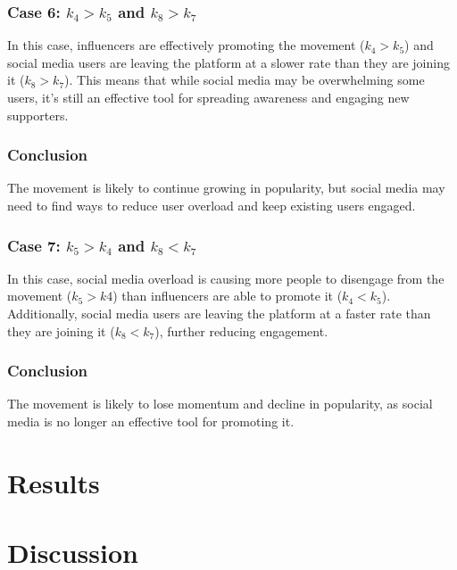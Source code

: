 \documentclass{article}
\begin{document}
    \subsubsection*{Case 6: $k_4 > k_5$ and $k_8 > k_7$}

    In this case, influencers are effectively promoting the movement ($k_4 > k_5$) and social media users are leaving the platform at a slower rate than they are joining it ($k_8 > k_7$). This means that while social media may be overwhelming some users, it's still an effective tool for spreading awareness and engaging new supporters.

    \subsubsection*{Conclusion}
    The movement is likely to continue growing in popularity, but social media may need to find ways to reduce user overload and keep existing users engaged.

    \subsubsection*{Case 7: $k_5 > k_4$ and $k_8 < k_7$}
    In this case, social media overload is causing more people to disengage from the movement ($k_5 > k4$) than influencers are able to promote it ($k_4 < k_5$). Additionally, social media users are leaving the platform at a faster rate than they are joining it ($k_8 < k_7$), further reducing engagement.

    \subsubsection*{Conclusion}
    The movement is likely to lose momentum and decline in popularity, as social media is no longer an effective tool for promoting it.

    \section{Results}
    \section{Discussion}
    \newpage
    
    
    
\end{document}
